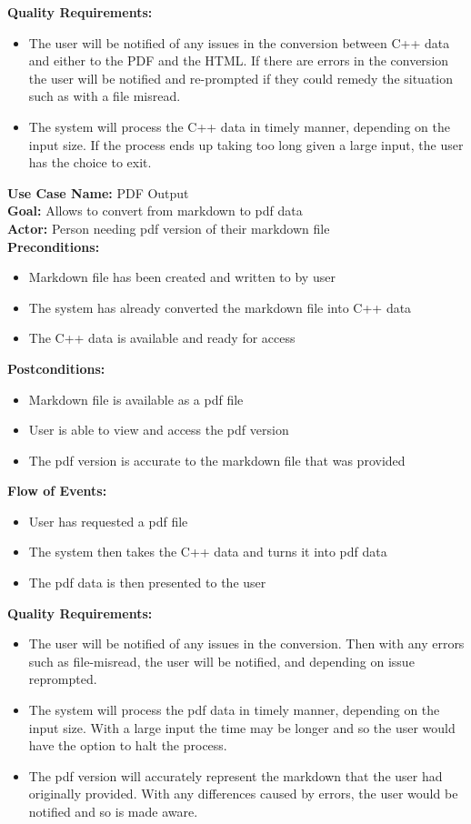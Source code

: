 \textbf{Quality Requirements:} 
\begin{itemize}
\item The user will be notified of any issues in the conversion between C++ data and either to the PDF and the HTML. If there are errors in the conversion the user will be notified and re-prompted if they could remedy the situation such as with a file misread.
\item The system will process the C++ data in timely manner, depending on the input size. If the process ends up taking too long given a large input, the user has the choice to exit. 
\end{itemize}
\textbf{Use Case Name:} PDF Output  
\\
\textbf{Goal:} Allows to convert from markdown to pdf data
\\
\textbf{Actor:} Person needing pdf version of their markdown file
\\
\textbf{Preconditions:} 
\begin{itemize}
\item Markdown file has been created and written to by user 
\item The system has already converted the markdown file into C++ data
\item The C++ data is available and ready for access 
\end{itemize}
\textbf{Postconditions:} 
\begin{itemize}
\item Markdown file is available as a pdf file 
\item User is able to view and access the pdf version
\item The pdf version is accurate to the markdown file that was provided 
\end{itemize}
\textbf{Flow of Events:} 
\begin{itemize} 
\item User has requested a pdf file
\item The system then takes the C++ data and turns it into pdf data 
\item The pdf data is then presented to the user 
\end{itemize}
\textbf{Quality Requirements:} 
\begin{itemize}
\item The user will be notified of any issues in the conversion. Then with any errors such as file-misread, the user will be notified, and depending on issue reprompted. 
\item The system will process the pdf data in timely manner, depending on the input size. With a large input the time may be longer and so the user would have the option to halt the process. 
\item The pdf version will accurately represent the markdown that the user had originally provided. With any differences caused by errors, the user would be notified and so is made aware.
%
\end{itemize} 
